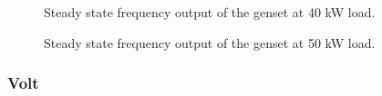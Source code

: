 \begin{figure}[H]
\centering

\caption{Steady state frequency output of the genset at 40 kW load.}
\label{fig:test8-9steadyfrequency40kw}
\end{figure}

\begin{figure}[H]
\centering

\caption{Steady state frequency output of the genset at 50 kW load.}
\label{fig:test8-9steadyfrequency50kw}
\end{figure}

% 

% 

% 

% 

% 

\subsubsection*{Volt}


